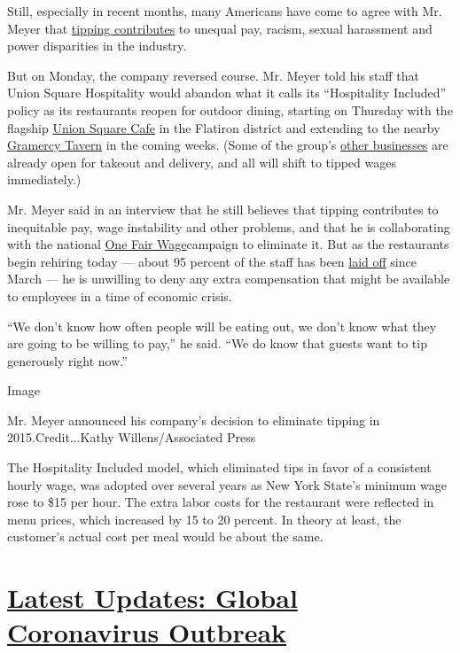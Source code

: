 Still, especially in recent months, many Americans have come to agree
with Mr. Meyer that
\href{https://www.nytimes3xbfgragh.onion/2019/10/24/opinion/tipping.html}{tipping
contributes} to unequal pay, racism, sexual harassment and power
disparities in the industry.

But on Monday, the company reversed course. Mr. Meyer told his staff
that Union Square Hospitality would abandon what it calls its
``Hospitality Included'' policy as its restaurants reopen for outdoor
dining, starting on Thursday with the flagship
\href{https://www.unionsquarecafe.com/}{Union Square Cafe} in the
Flatiron district and extending to the nearby
\href{https://www.unionsquarecafe.com/}{Gramercy Tavern} in the coming
weeks. (Some of the group's
\href{https://www.dailyprovisionsnyc.com/}{other businesses} are already
open for takeout and delivery, and all will shift to tipped wages
immediately.)

Mr. Meyer said in an interview that he still believes that tipping
contributes to inequitable pay, wage instability and other problems, and
that he is collaborating with the national
\href{https://onefairwage.com/saru-jayaraman/}{One Fair Wage}campaign to
eliminate it. But as the restaurants begin rehiring today --- about 95
percent of the staff has been
\href{https://www.nytimes3xbfgragh.onion/2020/03/18/dining/union-square-hospitality-group-layoffs.html}{laid
off} since March --- he is unwilling to deny any extra compensation that
might be available to employees in a time of economic crisis.

``We don't know how often people will be eating out, we don't know what
they are going to be willing to pay,'' he said. ``We do know that guests
want to tip generously right now.''

Image

Mr. Meyer announced his company's decision to eliminate tipping in
2015.Credit...Kathy Willens/Associated Press

The Hospitality Included model, which eliminated tips in favor of a
consistent hourly wage, was adopted over several years as New York
State's minimum wage rose to \$15 per hour. The extra labor costs for
the restaurant were reflected in menu prices, which increased by 15 to
20 percent. In theory at least, the customer's actual cost per meal
would be about the same.

\hypertarget{latest-updates-global-coronavirus-outbreak}{%
\section{\texorpdfstring{\href{https://www.nytimes3xbfgragh.onion/2020/08/01/world/coronavirus-covid-19.html?action=click\&pgtype=Article\&state=default\&region=MAIN_CONTENT_1\&context=storylines_live_updates}{Latest
Updates: Global Coronavirus
Outbreak}}{Latest Updates: Global Coronavirus Outbreak}}\label{latest-updates-global-coronavirus-outbreak}}

